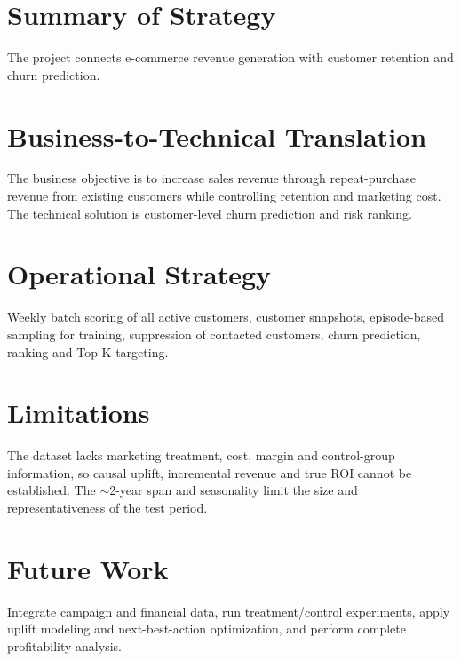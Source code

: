 \section{Summary of Strategy}
\label{sec:12-1}

The project connects e-commerce revenue generation with customer retention and churn prediction.

\section{Business-to-Technical Translation}
\label{sec:12-2}

The business objective is to increase sales revenue through repeat-purchase revenue from existing customers while controlling retention and marketing cost. The technical solution is customer-level churn prediction and risk ranking.

\section{Operational Strategy}
\label{sec:12-3}

Weekly batch scoring of all active customers, customer snapshots, episode-based sampling for training, suppression of contacted customers, churn prediction, ranking and Top-K targeting.

\section{Limitations}
\label{sec:12-4}

The dataset lacks marketing treatment, cost, margin and control-group information, so causal uplift, incremental revenue and true ROI cannot be established. The $\sim$2-year span and seasonality limit the size and representativeness of the test period.

\section{Future Work}
\label{sec:12-5}

Integrate campaign and financial data, run treatment/control experiments, apply uplift modeling and next-best-action optimization, and perform complete profitability analysis.
